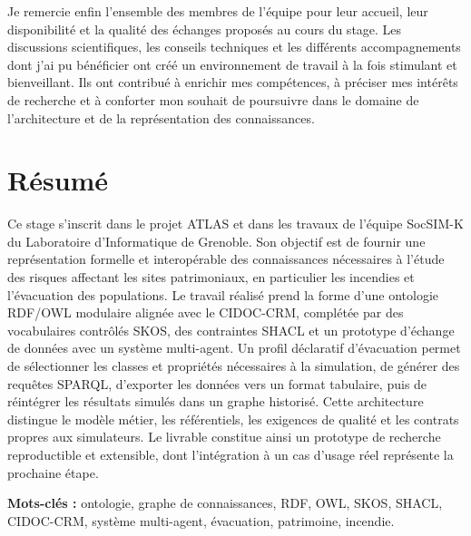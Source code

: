 \documentclass{article}
\begin{document}
Je remercie enfin l'ensemble des membres de l'équipe pour leur accueil, leur disponibilité et la qualité des échanges proposés au cours du stage. Les discussions scientifiques, les conseils techniques et les différents accompagnements dont j'ai pu bénéficier ont créé un environnement de travail à la fois stimulant et bienveillant. Ils ont contribué à enrichir mes compétences, à préciser mes intérêts de recherche et à conforter mon souhait de poursuivre dans le domaine de l'architecture et de la représentation des connaissances.

\clearpage

\section*{Résumé}

Ce stage s'inscrit dans le projet ATLAS et dans les travaux de l'équipe SocSIM-K du Laboratoire d'Informatique de Grenoble. Son objectif est de fournir une représentation formelle et interopérable des connaissances nécessaires à l'étude des risques affectant les sites patrimoniaux, en particulier les incendies et l'évacuation des populations. Le travail réalisé prend la forme d'une ontologie RDF/OWL modulaire alignée avec le CIDOC-CRM, complétée par des vocabulaires contrôlés SKOS, des contraintes SHACL et un prototype d'échange de données avec un système multi-agent. Un profil déclaratif d'évacuation permet de sélectionner les classes et propriétés nécessaires à la simulation, de générer des requêtes SPARQL, d'exporter les données vers un format tabulaire, puis de réintégrer les résultats simulés dans un graphe historisé. Cette architecture distingue le modèle métier, les référentiels, les exigences de qualité et les contrats propres aux simulateurs. Le livrable constitue ainsi un prototype de recherche reproductible et extensible, dont l'intégration à un cas d'usage réel représente la prochaine étape.

\textbf{Mots-clés :} ontologie, graphe de connaissances, RDF, OWL, SKOS, SHACL, CIDOC-CRM, système multi-agent, évacuation, patrimoine, incendie.

\clearpage

\renewcommand{\contentsname}{Table des Matières} %
\tableofcontents
\clearpage

\listoffigures
{}
\clearpage

\lstlistoflistings
{}
\clearpage
\end{document}
